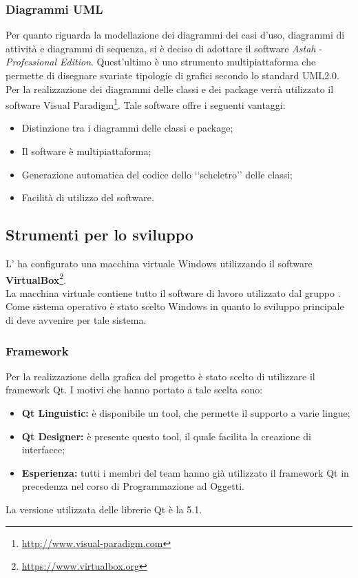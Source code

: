 \subsubsection{Diagrammi UML}
\label{UML}
Per quanto riguarda la modellazione dei diagrammi dei casi d'uso, diagrammi di attività e diagrammi di sequenza, si è deciso di adottare il software \textit{Astah}\glossario{} - \textit{Professional Edition}. Quest'ultimo è uno strumento multipiattaforma che permette di disegnare svariate tipologie di grafici secondo lo standard UML2.0\glossario{}.\\
Per la realizzazione dei diagrammi delle classi e dei package\glossario{} verrà utilizzato il software Visual Paradigm\footnote{\url{http://www.visual-paradigm.com}}. Tale software offre i seguenti vantaggi:
\begin{itemize}
	\item Distinzione tra i diagrammi delle classi e package\glossario{};
	\item Il software è multipiattaforma;
	\item Generazione automatica del codice dello \lq\lq{}scheletro\rq\rq{} delle classi;
	\item Facilità di utilizzo del software.
\end{itemize}

\subsection{Strumenti per lo sviluppo}
\label{ambientesviluppo}
L'\administrator{} ha configurato una macchina virtuale Windows\glossario{} utilizzando il software \textbf{VirtualBox}\footnote{\url{https://www.virtualbox.org}}.
\\La macchina virtuale contiene tutto il software di lavoro utilizzato dal gruppo \authorName{}.
\\Come sistema operativo è stato scelto Windows\glossario{} in quanto lo sviluppo principale di \project{} deve avvenire per tale sistema.

\subsubsection{Framework}
\label{framework}
Per la realizzazione della grafica del progetto è stato scelto di utilizzare il framework\glossario{} Qt\glossario{}.
I motivi che hanno portato a tale scelta sono:
\begin{itemize}
\item \textbf{Qt Linguistic:} è disponibile un tool\glossario{}, che permette il supporto a varie lingue;
\item \textbf{Qt Designer:} è presente questo tool\glossario{}, il quale facilita la creazione di interfacce;
\item \textbf{Esperienza:} tutti i membri del team hanno già utilizzato il framework\glossario{} Qt\glossario{} in precedenza nel corso di Programmazione ad Oggetti.
\end{itemize}
La versione utilizzata delle librerie Qt\glossario{} è la 5.1.


